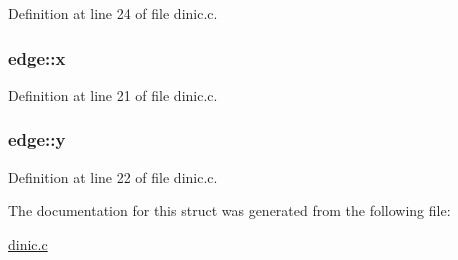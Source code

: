 Definition at line 24 of file dinic.c.

\hypertarget{structedge_ac917d6c1141dc02c8226ff4ba91a3e3f}{
\subsubsection[{x}]{ {\bf edge::x}}}
\label{structedge_ac917d6c1141dc02c8226ff4ba91a3e3f}


Definition at line 21 of file dinic.c.

\hypertarget{structedge_ae1a800d243b7d9e6cddef1031a02237f}{
\subsubsection[{y}]{ {\bf edge::y}}}
\label{structedge_ae1a800d243b7d9e6cddef1031a02237f}


Definition at line 22 of file dinic.c.



The documentation for this struct was generated from the following file:\begin{DoxyCompactItemize}
\item 
\hyperlink{dinic_8c}{dinic.c}\end{DoxyCompactItemize}
